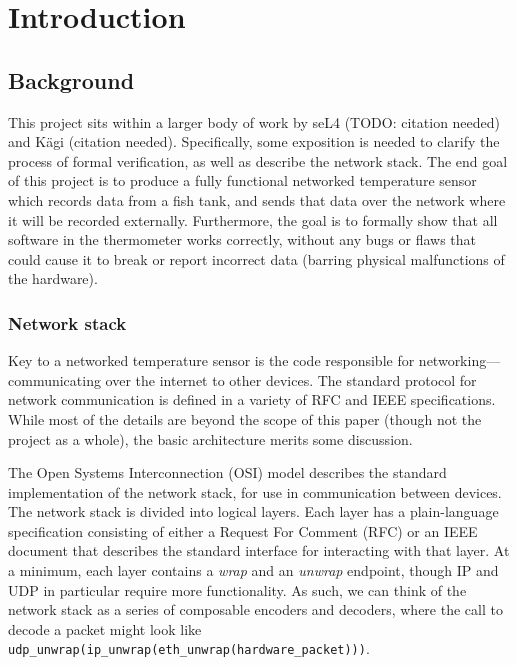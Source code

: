 \documentclass[twoside]{memoir}
\begin{document}
\tableofcontents


\mainmatter

\chapter{Introduction}

\section{Background}

This project sits within a larger body of work by seL4 (TODO: citation needed) and K{\"a}gi (citation needed).
Specifically, some exposition is needed to clarify the process of
formal verification, as well as describe the network stack.
The end goal of this project is to produce a fully functional
networked temperature sensor which records data from a fish tank,
and sends that data over the network where it will be recorded externally.
Furthermore, the goal is to formally show that all software in the
thermometer works correctly, without any bugs or flaws that could cause
it to break or report incorrect data (barring physical malfunctions of the hardware).

\subsection{Network stack}
Key to a networked temperature sensor is the code responsible for networking---communicating over the internet to other devices.
The standard protocol for network communication is defined in
a variety of RFC and IEEE specifications.
While most of the details are beyond the scope of this paper
(though not the project as a whole), the basic architecture merits some
discussion.

The Open Systems Interconnection (OSI) model describes the standard
implementation of the network stack, for use in communication between
devices.
The network stack is divided into logical layers.
Each layer has a plain-language specification
consisting of either a Request For Comment (RFC) or an IEEE document
that describes the standard interface for interacting with that layer.
At a minimum, each layer contains a \textit{wrap} and an \textit{unwrap}
endpoint, though IP and UDP in particular require more functionality.
As such, we can think of the network stack as a series of composable
encoders and decoders,
where the call to decode a packet might look like
\lstinline{udp_unwrap(ip_unwrap(eth_unwrap(hardware_packet)))}.
\end{document}
